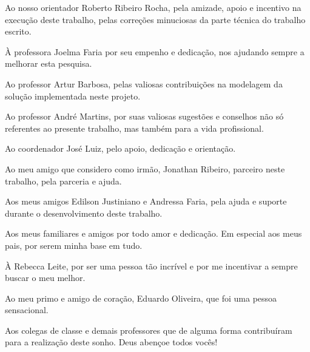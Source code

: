 \begin{agradecimentos}
\par Ao nosso orientador Roberto Ribeiro Rocha, pela amizade, apoio e incentivo na 
execução deste trabalho, pelas correções minuciosas da parte técnica do trabalho 
escrito. 

\par À professora Joelma Faria por seu empenho e dedicação, nos ajudando sempre a 
melhorar esta pesquisa.

\par Ao professor Artur Barbosa, pelas valiosas contribuições na modelagem da solução
implementada neste projeto.

\par Ao professor André Martins, por suas valiosas sugestões e conselhos não só 
referentes ao presente trabalho, mas também para a vida profissional.

\par Ao coordenador José Luiz, pelo apoio, dedicação e orientação.

\par Ao meu amigo que considero como irmão, Jonathan Ribeiro, parceiro neste trabalho, 
pela parceria e ajuda.

\par Aos meus amigos Edilson Justiniano e Andressa Faria, pela ajuda e suporte durante
o desenvolvimento deste trabalho.

\par Aos meus familiares e amigos por todo amor e dedicação. Em especial aos meus
pais, por serem minha base em tudo.

\par À Rebecca Leite, por ser uma pessoa tão incrível e por me incentivar a sempre
buscar o meu melhor.

\par Ao meu primo e amigo de coração, Eduardo Oliveira, que foi uma pessoa sensacional.

\par Aos colegas de classe e demais professores que de alguma forma contribuíram
para a realização deste sonho. Deus abençoe todos vocês!

\end{agradecimentos}




